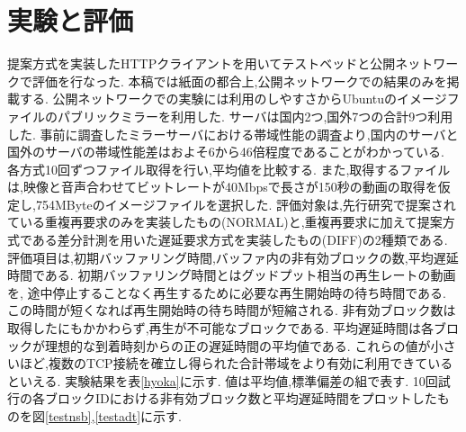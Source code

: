 \documentclass{ltjsarticle}
\begin{document}
\section{実験と評価}
\vspace{-3mm}
提案方式を実装したHTTPクライアントを用いてテストベッドと公開ネットワークで評価を行なった.
本稿では紙面の都合上,公開ネットワークでの結果のみを掲載する.
公開ネットワークでの実験には利用のしやすさからUbuntuのイメージファイルのパブリックミラーを利用した.
サーバは国内2つ,国外7つの合計9つ利用した.
事前に調査したミラーサーバにおける帯域性能の調査より,国内のサーバと国外のサーバの帯域性能差はおよそ6から46倍程度であることがわかっている.
各方式10回ずつファイル取得を行い,平均値を比較する.
また,取得するファイルは,映像と音声合わせてビットレートが40Mbpsで長さが150秒の動画の取得を仮定し,754MByteのイメージファイルを選択した.
評価対象は,先行研究で提案されている重複再要求のみを実装したもの(NORMAL)と,重複再要求に加えて提案方式である差分計測を用いた遅延要求方式を実装したもの(DIFF)の2種類である.
評価項目は,初期バッファリング時間,バッファ内の非有効ブロックの数,平均遅延時間である.
初期バッファリング時間とはグッドプット相当の再生レートの動画を,
途中停止することなく再生するために必要な再生開始時の待ち時間である.
この時間が短くなれば再生開始時の待ち時間が短縮される.
非有効ブロック数は取得したにもかかわらず,再生が不可能なブロックである.
平均遅延時間は各ブロックが理想的な到着時刻からの正の遅延時間の平均値である.
これらの値が小さいほど,複数のTCP接続を確立し得られた合計帯域をより有効に利用できているといえる.
実験結果を表\ref{hyoka}に示す.
値は平均値,標準偏差の組で表す.
10回試行の各ブロックIDにおける非有効ブロック数と平均遅延時間をプロットしたものを図\ref{testnsb},\ref{testadt}に示す.
\vspace{-8mm}
\begin{table}[htb]
	\begin{center}
		\caption{実験結果}
		\vspace{-0.5mm}
		\label{hyoka}
	\end{center}
\end{table}
\vspace{-11.25mm}
\end{document}

